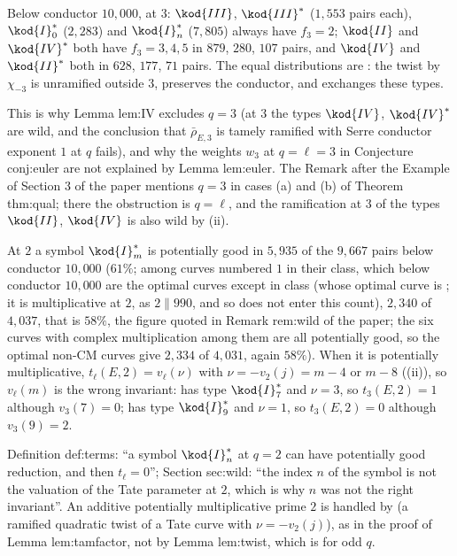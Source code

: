 Below conductor $10{,}000$, at $3$: $\kod{III}$, $\kod{III}^*$ ($1{,}553$ pairs each), $\kod{I}_0^*$ ($2{,}283$) and $\kod{I}_n^*$ ($7{,}805$) always have
$f_3=2$; $\kod{II}$ and $\kod{IV}^*$ both have $f_3=3,4,5$ in $879$, $280$, $107$ pairs, and $\kod{IV}$ and $\kod{II}^*$ both in $628$, $177$, $71$
pairs. The equal distributions are : the twist by $\chi_{-3}$ is unramified outside $3$, preserves the
conductor, and exchanges these types.

\begin{paperlink}
This is why Lemma lem:IV excludes $q=3$ (at $3$ the types $\kod{IV}$, $\kod{IV}^*$ are wild, and the conclusion that
$\bar\rho_{E,3}$ is tamely ramified with Serre conductor exponent $1$ at $q$ fails), and why the weights $w_3$ at $q=\ell=3$ in Conjecture conj:euler are not explained by Lemma lem:euler. The
Remark after the Example of Section 3 of the paper mentions $q=3$ in cases (a) and (b) of Theorem thm:qual; there the obstruction is
$q=\ell$, and the ramification at $3$ of the types $\kod{II}$, $\kod{IV}$ is also wild by (ii).
\end{paperlink}

\begin{remark}\label{rem:reduction:Instar-at-2}
At $2$ a symbol $\kod{I}_m^*$ is potentially good in $5{,}935$ of the $9{,}667$ pairs below conductor $10{,}000$ ($61\%$; among curves
numbered $1$ in their class, which below conductor $10{,}000$ are the optimal curves except in class  (whose optimal
curve is ; it is multiplicative at $2$, as $2\parallel990$, and so does not enter this count), $2{,}340$ of $4{,}037$, that is $58\%$, the
figure quoted in Remark rem:wild of the paper; the six curves with complex multiplication among them are all potentially good, so the
optimal non-CM curves give $2{,}334$ of $4{,}031$, again $58\%$). When it is
potentially multiplicative, $t_\ell(E,2)=v_\ell(\nu)$ with $\nu=-v_2(j)=m-4$ or $m-8$ ((ii)), so
$v_\ell(m)$ is the wrong invariant:  has type $\kod{I}_7^*$ and $\nu=3$, so $t_3(E,2)=1$ although $v_3(7)=0$;  has
type $\kod{I}_9^*$ and $\nu=1$, so $t_3(E,2)=0$ although $v_3(9)=2$.
\end{remark}

\begin{paperlink}
Definition def:terms: ``a symbol $\kod{I}_n^*$ at $q=2$ can have potentially good reduction, and then $t_\ell=0$''; Section sec:wild: ``the
index $n$ of the symbol is not the valuation of the Tate parameter at $2$, which is why $n$ was not the right invariant''. An additive potentially multiplicative prime $2$ is handled by  (a ramified quadratic
twist of a Tate curve with $\nu=-v_2(j)$), as in the proof of Lemma lem:tamfactor, not by Lemma lem:twist, which is for odd $q$.
\end{paperlink}

